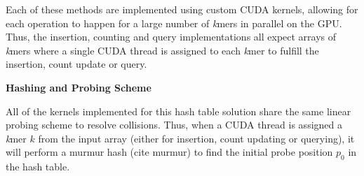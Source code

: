 Each of these methods are implemented using custom CUDA kernels, allowing for each operation to happen for a large number of \textit{k}mers in parallel on the GPU.
Thus, the insertion, counting and query implementations all expect arrays of \textit{k}mers where a single CUDA thread is assigned to each \textit{k}mer to fulfill the insertion, count update or query.

\textbf{Hashing and Probing Scheme}

All of the kernels implemented for this hash table solution share the same linear probing scheme to resolve collisions.
Thus, when a CUDA thread is assigned a \textit{k}mer $k$ from the input array (either for insertion, count updating or querying), it will perform a murmur hash (cite murmur) to find the initial probe position $p_0$ in the hash table.


